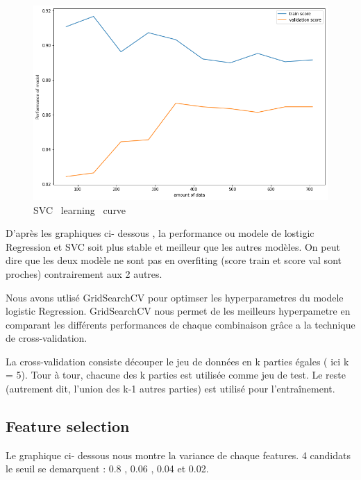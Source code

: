\documentclass[12pt]{article}
\begin{document}
\begin{figure}[H]
\begin{center}
\includegraphics[scale=0.6]{learning_curve_4.png} 
\caption[]{ SVC \ learning \ curve }
\end{center}
\end{figure}


D'après les graphiques ci- dessous , la performance ou modele de lostigic Regression et SVC soit plus stable et meilleur que les autres modèles. On peut dire que les deux modèle ne sont pas en overfiting
(score train et score val sont proches) contrairement aux 2 autres.


Nous avons utlisé  GridSearchCV pour optimser les hyperparametres du modele  logistic Regression. 
GridSearchCV nous permet de les meilleurs hyperpametre en comparant les différents performances 
 de chaque combinaison grâce a la technique de cross-validation.

La cross-validation consiste découper le jeu de données en k parties égales  ( ici k = 5). Tour à tour, chacune des k parties est utilisée comme jeu de test. Le reste (autrement dit, l’union des k-1 autres parties) est utilisé pour l'entraînement.

  
\subsection{Feature selection} 

Le graphique ci- dessous nous montre la variance de chaque features. 
 4 candidats  le seuil se demarquent : 0.8 , 0.06 , 0.04 et 0.02.
\end{document}

